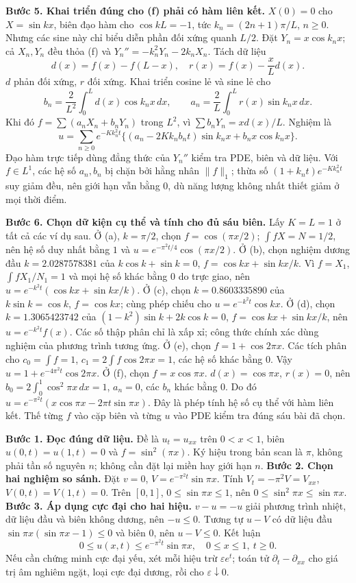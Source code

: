 \textbf{Bước 5. Khai triển đúng cho (f) phải có hàm liên kết.}
$X(0)=0$ cho $X=\sin kx$, biên đạo hàm cho $\cos kL=-1$, tức $k_n=(2n+1)\pi/L$, $n\ge0$. Nhưng các sine này chỉ biểu diễn phần đối xứng quanh $L/2$. Đặt $Y_n=x\cos k_nx$; cả $X_n,Y_n$ đều thỏa (f) và $Y_n''=-k_n^2Y_n-2k_nX_n$. Tách dữ liệu
\[d(x)=f(x)-f(L-x),\quad r(x)=f(x)-\frac xL d(x).\]
$d$ phản đối xứng, $r$ đối xứng. Khai triển cosine lẻ và sine lẻ cho
\[b_n=\frac2{L^2}\int_0^Ld(x)\cos k_nx\,dx,\qquad
a_n=\frac2L\int_0^Lr(x)\sin k_nx\,dx.\]
Khi đó $f=\sum(a_nX_n+b_nY_n)$ trong $L^2$, vì $\sum b_nY_n=xd(x)/L$. Nghiệm là
\[u=\sum_{n\ge0}e^{-Kk_n^2t}
\{(a_n-2Kk_nb_nt)\sin k_nx+b_nx\cos k_nx\}.\]
Đạo hàm trực tiếp dùng đẳng thức của $Y_n''$ kiểm tra PDE, biên và dữ liệu. Với $f\in L^1$, các hệ số $a_n,b_n$ bị chặn bởi hằng nhân $\|f\|_1$; thừa số $(1+k_nt)e^{-Kk_n^2t}$ suy giảm đều, nên giới hạn vẫn bằng $0$, dù năng lượng không nhất thiết giảm ở mọi thời điểm.

\textbf{Bước 6. Chọn dữ kiện cụ thể và tính cho đủ sáu biên.}
Lấy $K=L=1$ ở tất cả các ví dụ sau. Ở (a), $k=\pi/2$, chọn $f=\cos(\pi x/2)$; $\int fX=N=1/2$, nên hệ số duy nhất bằng $1$ và $u=e^{-\pi^2t/4}\cos(\pi x/2)$.
Ở (b), chọn nghiệm dương đầu $k=2.0287578381$ của $k\cos k+\sin k=0$, $f=\cos kx+\sin kx/k$. Vì $f=X_1$, $\int fX_1/N_1=1$ và mọi hệ số khác bằng $0$ do trực giao, nên $u=e^{-k^2t}(\cos kx+\sin kx/k)$. Ở (c), chọn $k=0.8603335890$ của $k\sin k=\cos k$, $f=\cos kx$; cùng phép chiếu cho $u=e^{-k^2t}\cos kx$. Ở (d), chọn $k=1.3065423742$ của $(1-k^2)\sin k+2k\cos k=0$, $f=\cos kx+\sin kx/k$, nên $u=e^{-k^2t}f(x)$. Các số thập phân chỉ là xấp xỉ; công thức chính xác dùng nghiệm của phương trình tương ứng.
Ở (e), chọn $f=1+\cos2\pi x$. Các tích phân cho $c_0=\int f=1$, $c_1=2\int f\cos2\pi x=1$, các hệ số khác bằng $0$. Vậy $u=1+e^{-4\pi^2t}\cos2\pi x$.
Ở (f), chọn $f=x\cos\pi x$. $d(x)=\cos\pi x$, $r(x)=0$, nên $b_0=2\int_0^1\cos^2\pi x\,dx=1$, $a_n=0$, các $b_n$ khác bằng $0$. Do đó $u=e^{-\pi^2t}(x\cos\pi x-2\pi t\sin\pi x)$. Đây là phép tính hệ số cụ thể với hàm liên kết. Thế từng $f$ vào cặp biên và từng $u$ vào PDE kiểm tra đúng sáu bài đã chọn.

\textbf{Bước 1. Đọc đúng dữ liệu.} Đề là $u_t=u_{xx}$ trên $0<x<1$, biên $u(0,t)=u(1,t)=0$ và $f=\sin^2(\pi x)$. Ký hiệu trong bản scan là $\pi$, không phải tần số nguyên $n$; không cần đặt lại miền hay giới hạn $n$.
\textbf{Bước 2. Chọn hai nghiệm so sánh.} Đặt $v=0$, $V=e^{-\pi^2t}\sin\pi x$. Tính $V_t=-\pi^2V=V_{xx}$, $V(0,t)=V(1,t)=0$. Trên $[0,1]$, $0\le\sin\pi x\le1$, nên $0\le\sin^2\pi x\le\sin\pi x$.
\textbf{Bước 3. Áp dụng cực đại cho hai hiệu.} $v-u=-u$ giải phương trình nhiệt, dữ liệu đầu và biên không dương, nên $-u\le0$. Tương tự $u-V$ có dữ liệu đầu $\sin\pi x(\sin\pi x-1)\le0$ và biên $0$, nên $u-V\le0$. Kết luận
\[0\le u(x,t)\le e^{-\pi^2t}\sin\pi x,\quad 0\le x\le1,\ t\ge0.\]
Nếu cần chứng minh cực đại yếu, xét mỗi hiệu trừ $\varepsilon e^t$; toán tử $\partial_t-\partial_{xx}$ cho giá trị âm nghiêm ngặt, loại cực đại dương, rồi cho $\varepsilon\downarrow0$.

